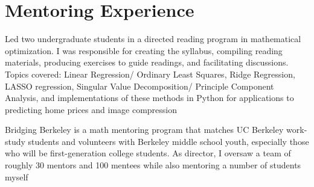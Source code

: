 \documentclass[11pt,letter]{moderncv}
\begin{document}
\section{Mentoring Experience}
\vspace{0.05in}
\begin{itemize}
 {Led two undergraduate students in a directed reading program in mathematical optimization.  I was responsible for creating the syllabus, compiling reading materials, producing exercises to guide readings, and facilitating discussions. Topics covered: Linear Regression/ Ordinary Least Squares, Ridge Regression, LASSO regression, Singular Value Decomposition/ Principle Component Analysis, and implementations of these methods in Python for applications to predicting home prices and 
image compression}{}{}{}{}
\end{itemize}
\vspace{0.05in}
\begin{itemize}
 {Bridging Berkeley is a math mentoring program that matches UC Berkeley work-study students and volunteers with Berkeley middle school youth, especially those who will be first-generation college students. As director, I oversaw a team of roughly 30 mentors and 100 mentees while also mentoring a number of students myself}{}{}{}{}
\end{itemize}
\vspace{0.05in}
%
%
\end{document}
